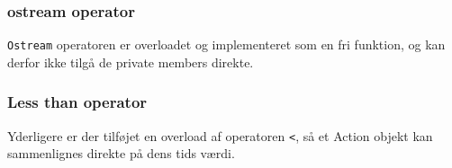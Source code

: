 \subsubsection{ostream operator}

\texttt{Ostream} operatoren er overloadet og implementeret som en fri funktion, og kan derfor ikke tilgå de private members direkte.

\subsubsection{Less than operator}

Yderligere er der tilføjet en overload af operatoren \texttt{<}, så et Action objekt kan sammenlignes direkte på dens tids værdi.

\clearpage